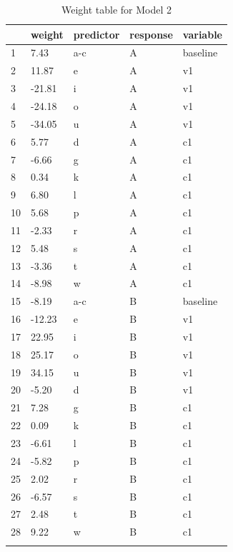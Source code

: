 \begin{table}[!htpb]
  \centering
  \begin{tabular}{lllll}
    \lsptoprule
       & weight & predictor & response & variable \\
    \midrule
    1  & 7.43   & a-c       & A        & baseline \\
    2  & 11.87  & e         & A        & v1       \\
    3  & -21.81 & i         & A        & v1       \\
    4  & -24.18 & o         & A        & v1       \\
    5  & -34.05 & u         & A        & v1       \\
    6  & 5.77   & d         & A        & c1       \\
    7  & -6.66  & g         & A        & c1       \\
    8  & 0.34   & k         & A        & c1       \\
    9  & 6.80   & l         & A        & c1       \\
    10 & 5.68   & p         & A        & c1       \\
    11 & -2.33  & r         & A        & c1       \\
    12 & 5.48   & s         & A        & c1       \\
    13 & -3.36  & t         & A        & c1       \\
    14 & -8.98  & w         & A        & c1       \\
    15 & -8.19  & a-c       & B        & baseline \\
    16 & -12.23 & e         & B        & v1       \\
    17 & 22.95  & i         & B        & v1       \\
    18 & 25.17  & o         & B        & v1       \\
    19 & 34.15  & u         & B        & v1       \\
    20 & -5.20  & d         & B        & v1       \\
    21 & 7.28   & g         & B        & c1       \\
    22 & 0.09   & k         & B        & c1       \\
    23 & -6.61  & l         & B        & c1       \\
    24 & -5.82  & p         & B        & c1       \\
    25 & 2.02   & r         & B        & c1       \\
    26 & -6.57  & s         & B        & c1       \\
    27 & 2.48   & t         & B        & c1       \\
    28 & 9.22   & w         & B        & c1       \\
    \lspbottomrule
  \end{tabular}\caption{Weight table for Model 2}\label{tab:model2-weights}
\end{table}

